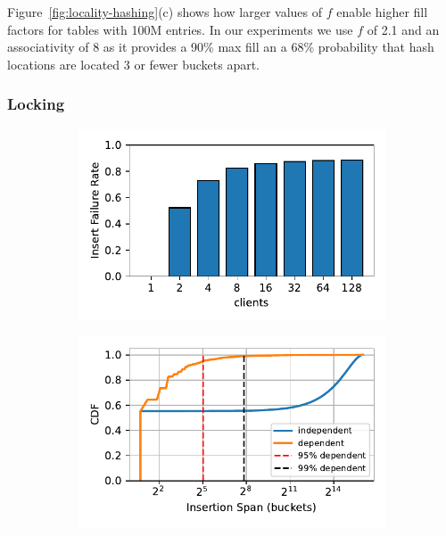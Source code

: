 Figure~\ref{fig:locality-hashing}(c) shows how larger values
of $f$ enable higher fill factors for tables with 100M
entries. In our experiments we use $f$ of 2.1 and an
associativity of 8 as it provides a 90\% max fill an a 68\%
probability that hash locations are located 3 or fewer
buckets apart.


\subsubsection{Locking}
\label{sec:locking}

\begin{figure}[t]
    \centering
    \begin{subfigure}{0.3\linewidth}
        \includegraphics[width=0.99\linewidth]{fig/optimistic_failures.pdf}
    \end{subfigure}
    \begin{subfigure}{0.3\linewidth}
        \includegraphics[width=0.99\linewidth]{fig/insertion_span.pdf}

\end{subfigure}
\end{figure}
